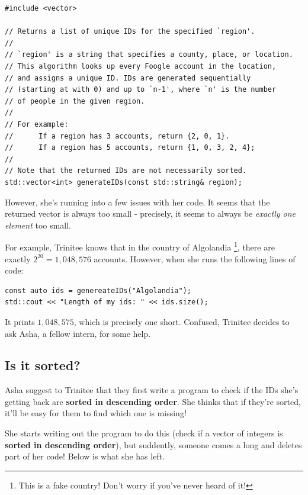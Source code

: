 \documentclass [12pt]{article}
\begin{document}
\vspace{2em}

\begin{verbatim}
#include <vector>

// Returns a list of unique IDs for the specified `region'.
//
// `region' is a string that specifies a county, place, or location.
// This algorithm looks up every Foogle account in the location,
// and assigns a unique ID. IDs are generated sequentially
// (starting at with 0) and up to `n-1', where `n' is the number
// of people in the given region.
//
// For example:
//      If a region has 3 accounts, return {2, 0, 1}.
//      If a region has 5 accounts, return {1, 0, 3, 2, 4};
//
// Note that the returned IDs are not necessarily sorted.
std::vector<int> generateIDs(const std::string& region);
\end{verbatim}

However, she's running into a few issues with her code. It seems that the returned vector is always too small - precisely, it seems to always be \textit{exactly one element} too small. 


For example, Trinitee knows that in the country of Algolandia \footnote{This is a fake country! Don't worry if you've never heard of it!}, there are exactly $2^{20} = 1,048,576$ accounts. However, when she runs the following lines of code:

\vspace{2em}
\begin{verbatim}
const auto ids = genereateIDs("Algolandia");
std::cout << "Length of my ids: " << ids.size();
\end{verbatim}

It prints $1,048,575$, which is precisely one short. Confused, Trinitee decides to ask Asha, a fellow intern, for some help.

\subsection{Is it sorted?}
 Asha suggest to Trinitee that they first write a program to check if the IDs she's getting back are \textbf{sorted in descending order}. She thinks that if they're sorted, it'll be easy for them to find which one is missing!

She starts writing out the program to do this (check if a vector of integers is \textbf{sorted in descending order}), but suddently, someone comes a long and deletes part of her code! Below is what she has left.
\end{document}

